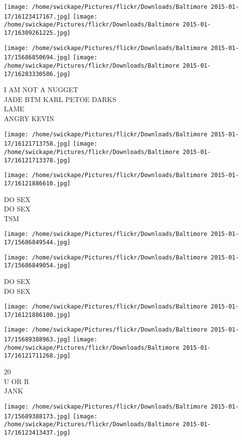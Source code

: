 \documentclass[10pt,letterpaper]{article}
\begin{document}
\texttt{[image: /home/swickape/Pictures/flickr/Downloads/Baltimore 2015-01-17/16123417167.jpg]}
\texttt{[image: /home/swickape/Pictures/flickr/Downloads/Baltimore 2015-01-17/16309261225.jpg]}

\texttt{[image: /home/swickape/Pictures/flickr/Downloads/Baltimore 2015-01-17/15686850694.jpg]}
\texttt{[image: /home/swickape/Pictures/flickr/Downloads/Baltimore 2015-01-17/16283330586.jpg]}

I AM NOT A NUGGET\\
JADE BTM KARL PETOE DARKS\\
LAME\\
ANGRY KEVIN
\pagebreak

\texttt{[image: /home/swickape/Pictures/flickr/Downloads/Baltimore 2015-01-17/16121713758.jpg]}
\texttt{[image: /home/swickape/Pictures/flickr/Downloads/Baltimore 2015-01-17/16121713378.jpg]}

\vspace{0.25in}
\texttt{[image: /home/swickape/Pictures/flickr/Downloads/Baltimore 2015-01-17/16121886610.jpg]}

DO SEX\\
DO SEX\\
TSM
\pagebreak

\texttt{[image: /home/swickape/Pictures/flickr/Downloads/Baltimore 2015-01-17/15686849544.jpg]}

\vspace{0.25in}
\texttt{[image: /home/swickape/Pictures/flickr/Downloads/Baltimore 2015-01-17/15686849054.jpg]}

DO SEX\\
DO SEX
\pagebreak

\texttt{[image: /home/swickape/Pictures/flickr/Downloads/Baltimore 2015-01-17/16121886100.jpg]}

\vspace{0.25in}
\texttt{[image: /home/swickape/Pictures/flickr/Downloads/Baltimore 2015-01-17/15689388963.jpg]}
\texttt{[image: /home/swickape/Pictures/flickr/Downloads/Baltimore 2015-01-17/16121711268.jpg]}

20\\
U OR R\\
JANK
\pagebreak

\texttt{[image: /home/swickape/Pictures/flickr/Downloads/Baltimore 2015-01-17/15689388173.jpg]}
\texttt{[image: /home/swickape/Pictures/flickr/Downloads/Baltimore 2015-01-17/16123413437.jpg]}
\end{document}

